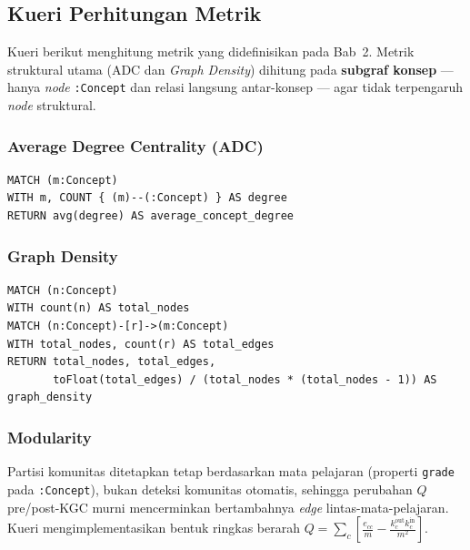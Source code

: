 \documentclass[../../thesis]{subfiles}
\begin{document}
\subsection{Kueri Perhitungan Metrik}
\label{lamp:cypher-metrik}

Kueri berikut menghitung metrik yang didefinisikan pada Bab~2. Metrik
struktural utama (ADC dan \textit{Graph Density}) dihitung pada
\textbf{subgraf konsep} --- hanya \textit{node} \texttt{:Concept} dan relasi
langsung antar-konsep --- agar tidak terpengaruh \textit{node} struktural.

\subsubsection{Average Degree Centrality (ADC)}

\begin{lstlisting}[style=cypherbox,caption={ADC pada subgraf konsep.},label={lst:cypher-adc}]
MATCH (m:Concept)
WITH m, COUNT { (m)--(:Concept) } AS degree
RETURN avg(degree) AS average_concept_degree
\end{lstlisting}

\subsubsection{Graph Density}

\begin{lstlisting}[style=cypherbox,caption={Graph Density pada subgraf konsep. Untuk kondisi pre-KGC tambahkan filter \texttt{WHERE NOT type(r) STARTS WITH 'LINTAS\_BUKU'}.},label={lst:cypher-density}]
MATCH (n:Concept)
WITH count(n) AS total_nodes
MATCH (n:Concept)-[r]->(m:Concept)
WITH total_nodes, count(r) AS total_edges
RETURN total_nodes, total_edges,
       toFloat(total_edges) / (total_nodes * (total_nodes - 1)) AS graph_density
\end{lstlisting}

\subsubsection{Modularity}

Partisi komunitas ditetapkan tetap berdasarkan mata pelajaran (properti
\texttt{grade} pada \texttt{:Concept}), bukan deteksi komunitas otomatis,
sehingga perubahan $Q$ pre/post-KGC murni mencerminkan bertambahnya
\textit{edge} lintas-mata-pelajaran. Kueri mengimplementasikan bentuk ringkas
berarah $Q = \sum_{c}\left[\frac{e_{cc}}{m} - \frac{k_c^{\text{out}}k_c^{\text{in}}}{m^2}\right]$.
\end{document}
